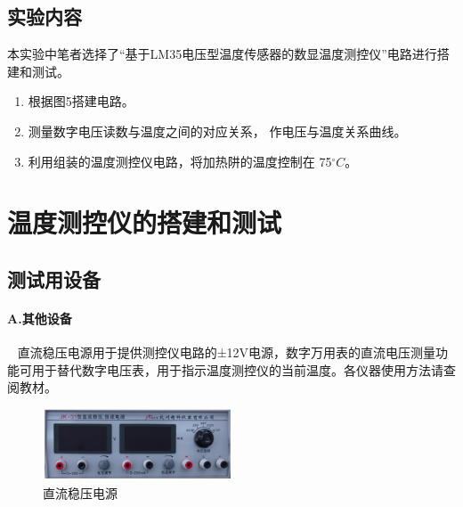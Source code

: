 \documentclass[10pt,a4paper,twocolumn,twoside,UTF8]{ctexart}
\begin{document}
	\subsection{实验内容}
	本实验中笔者选择了“基于LM35电压型温度传感器的数显温度测控仪”电路进行搭建和测试。
	\begin{enumerate}[(1)]
		\item 根据图5搭建电路。
		\item 测量数字电压读数与温度之间的对应关系， 作电压与温度关系曲线。
	 	\item 利用组装的温度测控仪电路，将加热阱的温度控制在 75$^{\circ}C$。
	\end{enumerate}



\section{温度测控仪的搭建和测试}

	\subsection{测试用设备}
	\paragraph{A.其他设备}~
	\newline
	\indent 直流稳压电源用于提供测控仪电路的±12V电源，数字万用表的直流电压测量功能可用于替代数字电压表，用于指示温度测控仪的当前温度。各仪器使用方法请查阅教材。

	\begin{figure}[htbp]
		\centering
		\includegraphics[width=0.5\textwidth]{img//device_3.png}
		\caption{直流稳压电源}
		\label{powersource}
	\end{figure}
\end{document}
